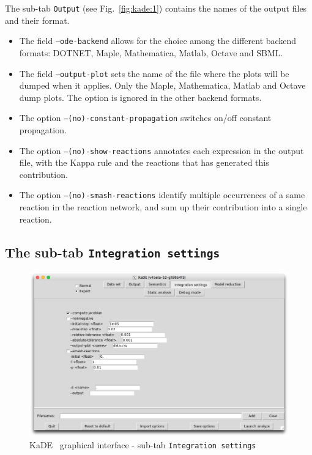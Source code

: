 \documentclass[11pt]{book}
\def\KaDE{\textsf{KaDE}}
\begin{document}
The sub-tab \texttt{Output} (see Fig.~\ref{fig:kade:1}) contains the names of the output files and their format.

\begin{itemize}
\item The field \texttt{--ode-backend} allows for the choice among the different backend formats: DOTNET, Maple, Mathematica, Matlab, Octave and SBML.
\item The field \texttt{--output-plot} sets the name of the file where the plots will be dumped when it applies. Only the Maple, Mathematica, Matlab and Octave dump plots. The option is ignored in the other backend formats.
\item The option \texttt{--(no)-constant-propagation} switches on/off constant propagation.
\item The option \texttt{--(no)-show-reactions} annotates each expression in the output file, with the Kappa rule and the reactions that has generated this contribution.
\item The option \texttt{--(no)-smash-reactions} identify multiple occurrences of a same reaction in the reaction network, and sum up  their contribution into a single reaction.
\end{itemize}

\subsection{The sub-tab \texttt{Integration settings}}

\begin{figure}[htbp]
\centering
\includegraphics[width=12cm,bb=0 0 1904 1208]{img/kade_3.png}
\caption{\KaDE~ graphical interface - sub-tab \texttt{Integration settings}}
\label{fig:kade:3}
\end{figure}
\end{document}
